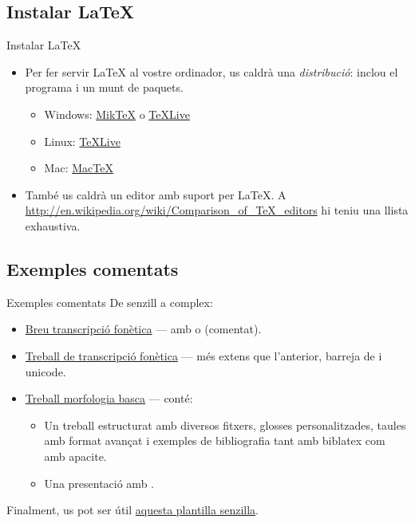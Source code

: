 \subsection{Instalar \LaTeX{}}
\begin{frame}{Instalar \LaTeX}
\begin{itemize}
\item Per fer servir \LaTeX{} al vostre ordinador, us caldrà una \emph{distribució}:
    inclou el programa  i un munt de paquets.
\begin{itemize}
\item Windows: \href{http://miktex.org/}{Mik\TeX} o \href{http://tug.org/texlive/}{\TeX Live}
\item Linux: \href{http://tug.org/texlive/}{\TeX Live}
\item Mac: \href{http://tug.org/mactex/}{Mac\TeX}
\end{itemize}
\item També us caldrà un editor amb suport per \LaTeX{}. A \url{http://en.wikipedia.org/wiki/Comparison_of_TeX_editors} hi teniu una llista exhaustiva.
\end{itemize}
\end{frame}

\subsection{Exemples comentats}
\begin{frame}{Exemples comentats}
De senzill a complex:
\begin{itemize}
    \item \href{https://www.overleaf.com/read/rgxbsfvqsgbw\#ba04b9}{Breu transcripció fonètica} --- amb  o  (comentat).
    \item \href{https://www.overleaf.com/read/mxysfjcnnppm\#294a25}{Treball de transcripció fonètica} --- més extens que l'anterior, barreja de  i unicode.
    \item \href{https://www.overleaf.com/read/sxkcdfrpmbcb\#10abd3}{Treball morfologia basca} --- conté:
\begin{itemize}
    \item Un treball estructurat amb diversos fitxers, glosses personalitzades, taules amb format avançat i exemples de bibliografia tant amb biblatex com amb apacite.
    \item Una presentació amb .
\end{itemize}
\end{itemize}

Finalment, us pot ser útil \href{https://www.overleaf.com/read/vsdvmbzywdrn\#d43fce}{aquesta plantilla senzilla}.

\end{frame}

